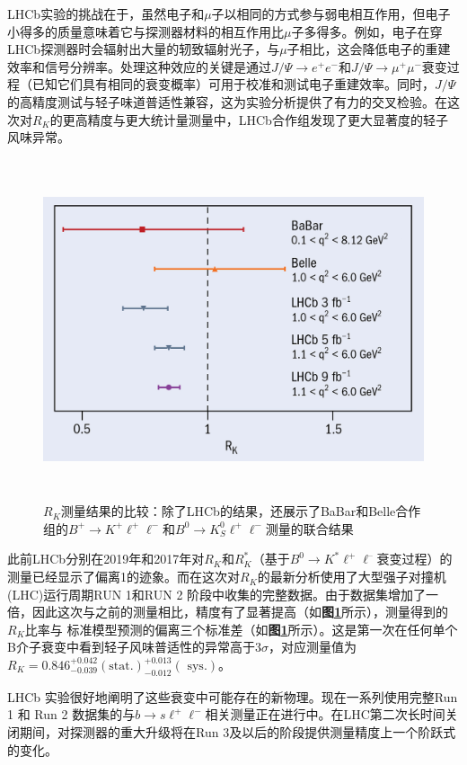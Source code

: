 LHCb实验的挑战在于，虽然电子和$\mu$子以相同的方式参与弱电相互作用，但电子小得多的质量意味着它与探测器材料的相互作用比$\mu$子多得多。例如，电子在穿LHCb探测器时会辐射出大量的轫致辐射光子，与$\mu$子相比，这会降低电子的重建效率和信号分辨率。处理这种效应的关键是通过$J/\Psi\to e^+e^-$和$J/\Psi\to \mu^+\mu^-$衰变过程（已知它们具有相同的衰变概率）可用于校准和测试电子重建效率。同时，$J/\Psi$的高精度测试与轻子味道普适性兼容，这为实验分析提供了有力的交叉检验。在这次对$R_K$的更高精度与更大统计量测量中，LHCb合作组发现了更大显著度的轻子风味异常。
\begin{figure}[H]
 \centering
 \includegraphics[height=10cm, width=14cm]{pictures/R_K_comparison.jpeg}
  \caption{$R_K$测量结果的比较\cite{RK_comparison_fig}：除了LHCb的结果，还展示了BaBar和Belle合作组的$B^+\to K^+\ell^+\ell^-$和$B^0\to K_S^0\ell^+\ell^-$测量的联合结果}
 \label{fig:1.2}
\end{figure}

此前LHCb分别在2019年\cite{RK_2019}和2017\cite{RKstar_2017}年对$R_K$和$R_K^*$（基于$B^0\to K^*\ell^+\ell^–$衰变过程）的测量已经显示了偏离1的迹象。而在这次对$R_K$的最新分析使用了大型强子对撞机(LHC)运行周期RUN 1和RUN 2 阶段中收集的完整数据。由于数据集增加了一倍，因此这次与之前的测量相比，精度有了显著提高（如\textbf{图\ref{fig:1.2}}所示），测量得到的$R_K$比率与 标准模型预测的偏离三个标准差（如\textbf{图\ref{fig:1.2}}所示）。这是第一次在任何单个B介子衰变中看到轻子风味普适性的异常高于3$\sigma$，对应测量值为$R_K=0.846^{+0.042}_{-0.039}(\text{stat.})^{+0.013}_{-0.012}(\text{ sys.})$。

LHCb 实验很好地阐明了这些衰变中可能存在的新物理。现在一系列使用完整Run 1 和 Run 2 数据集的与$b\to s\ell^+\ell^-$相关测量正在进行中。在LHC第二次长时间关闭期间，对探测器的重大升级将在Run 3及以后的阶段提供测量精度上一个阶跃式的变化。

